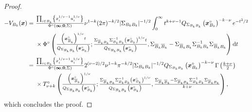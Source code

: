 \documentclass[lineno]{biometrika}
\begin{document}
\begin{proof}
\begin{align*}
 -V_{B_k}(\bm x)  =&\ {\textstyle{\prod_{i\in B_k} \left\{ x_i^{1/\nu-1}a_i^{1/\nu}\right\}\over\Phi^\circ(\bm \infty;\bm 0, \Sigma)}} \nu^{1-k} (2\pi)^{-k/2}|\Sigma_{B_k B_k}|^{-1/2}\int_0^\infty t^{k+\nu-1} Q_{\Sigma_{B_k B_k}} \left(\bm x_{B_k}^\circ\right)^{-k-\nu} e^{-t^2/2} \\
 &\ \times \Phi^\circ \left( {\textstyle{\left(\bm x_{{\overline{B}}_k}^\circ \right)^{1/\nu} t\over Q_{\Sigma_{B_k B_k}}\left(\bm x_{B_k}^\circ\right)}}; {\textstyle{\Sigma_{{\overline{B}}_k B_k}\Sigma_{B_k B_k}^{-1}\left(\bm x_{B_k}^\circ\right)^{1/\nu}t\over Q_{\Sigma_{B_k B_k}} \left(\bm x_{B_k}^\circ\right)}},\Sigma_{{\overline{B}}_k {\overline{B}}_k}-\Sigma_{{\overline{B}}_k B_k}\Sigma_{B_k B_k}^{-1}\Sigma_{{\overline{B}}_k B_k} \right) \text dt  \\
 =&\ {\textstyle{\prod_{i\in B_k} \left\{ x_i^{1/\nu-1}a_i^{1/\nu}\right\}\over\Phi^\circ(\bm \infty;\bm 0, \Sigma)}} 2^{(\nu-2)/2} \nu^{1-k} \pi^{-k/2}|\Sigma_{B_k B_k}|^{-1/2} Q_{\Sigma_{B_k B_k}}\left(\bm x_{B_k}^\circ\right)^{-k-\nu} \Gamma\left({\textstyle{k+\nu\over2}}\right) \\  
 &\ \times T_{\nu+k}^\circ \left( {\textstyle{\left(\bm x_{{\overline{B}}_k}^\circ \right)^{1/\nu}\over Q_{\Sigma_{B_k B_k}} \left( \bm x_{B_k}^\circ \right)}}; {\textstyle{\Sigma_{{\overline{B}}_k B_k}\Sigma_{B_k B_k}^{-1}\left(\bm x_{B_k}^\circ\right)^{1/\nu}\over Q_{\Sigma_{B_k B_k}}\left(\bm x_{B_k}^\circ\right)}}, {\textstyle{\Sigma_{{\overline{B}}_k {\overline{B}}_k}-\Sigma_{{\overline{B}}_k B_k}\Sigma_{B_k B_k}^{-1}\Sigma_{{\overline{B}}_k B_k}\over k+\nu}} \right), 
 \end{align*} 
which concludes the proof.
%
\end{proof}
\end{document}
